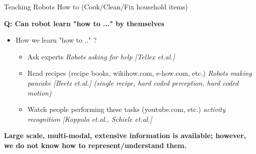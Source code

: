 \begin{frame}{Teaching Robots How to (Cook/Clean/Fix household items)}

{\bf Q: Can robot learn "how to ..." by themselves}

\begin{itemize}
\item How we learn "how to .." ?
\begin{itemize}
\item Ask experts \quad \emph{Robots asking for help [Tellex et.al.]}
\item Read recipes (recipe books, wikihow.com, e-how.com, etc.) \quad \emph{ Robots making pancake [Beetz et.al.] (single recipe, hard coded perception, hard coded motion)}
\item Watch people performing these tasks (youtube.com, etc.) \quad \emph{activity recognition [Koppula et.al.,  Schiele et.al.]}
\end{itemize}
\end{itemize}
\bf{Large scale, multi-modal, extensive information is available; however, we do not know how to represent/understand them.}
\end{frame}


